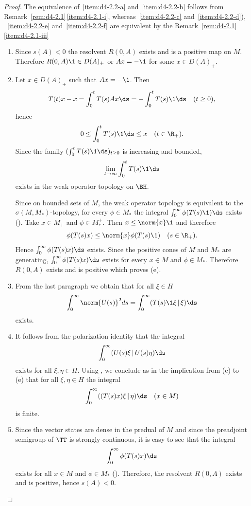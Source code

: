 \begin{proof}
The equivalence of~\ref{item:d4-2.2-a} and~\ref{item:d4-2.2-b} follows from Remark~\ref{rem:d4-2.1}\,\ref{item:d4-2.1-i}, whereas~\ref{item:d4-2.2-c} and~\ref{item:d4-2.2-d}), \resp ~\ref{item:d4-2.2-e} and~\ref{item:d4-2.2-f} are equivalent by the Remark~\ref{rem:d4-2.1}\,\ref{item:d4-2.1-iii}
\begin{enumerate}[wide, labelindent=.25em]

\item[(a) $\implies$ (c):] Since $s(A) < 0$ the resolvent $R(0,A)$ exists and is a positive map on $M$.
Therefore $R(0,A)\1 \in D(A)_{+}$ or $Ax = -\1$ for some $x \in D(A)_{+}$.


\item[(c) $\implies$ (e):] Let $x \in D(A)_{+}$ such that $Ax = -\1$.
Then
\[
T(t)x - x = \int_{0}^{t} T(s)Ax \ds = -\int_{0}^{t} T(s) \1 \ds \quad (t \geq 0),
\]
hence
\[
0 \leq \int_{0}^{t} T(s) \1 \ds \leq x \quad (t \in \R_{+}).
\]
Since the family $(\int_{0}^{t} T(s)\1 \ds)_{t \geq 0}$ is increasing and bounded, 
%
\[
	\lim_{t \to \infty} \int_{0}^{t} T(s) \1 \ds
\]
%
exists in the weak operator topology on $\BH$.

Since on bounded sets of\/ $M$, the weak operator topology is equivalent to the $\sigma(M,M_{*})$-topology, for every $\phi \in M_{*}$ the integral $ \int_{0}^{\infty}\phi(T(s) \1) \ds $ exists (\textcite[1.15.2.]{sakai:1971}).
Take $x \in M_{+}$ and $\phi \in M_{*}^{+}$.
Then $x \leq \norm{x} \1$ and therefore
\[
	\phi(T(s)x) \leq \norm{x}\phi(T(s) \1) \quad (s \in \R_{+}).
\]
Hence $\int_{0}^{\infty} \phi(T(s)x) \ds$ exists.
Since the positive cones of\/ $M$ and $M_{*}$ are generating, $\int_{0}^{\infty}\phi(T(s)x) \ds$ exists for every $x \in M$ and $\phi \in M_{*}$.
Therefore $R(0,A)$ exists and is positive which proves (e).

\item[(c) $\implies$ (g):] From the last paragraph we obtain that for all $\xi \in H$
\[
\int_{0}^{\infty}\norm{U(s)}^2ds = \int_{0}^{\infty}(T(s)\1\xi \,|\, \xi) \ds
\]
exists.

\item[(g) $\implies$ (h):] It follows from the polarization identity that the integral
\[
\int_{0}^{\infty}(U(s)\xi \,|\, U(s)\eta) \ds
\]
exists for all $\xi,\eta \in H$.
Using \textcite[Theorem III.4.2 and Theorem II.2.6]{takesaki:1979}, we conclude as in the implication from (c) to (e) that for all $\xi,\eta \in H$ the integral
\[
\int_{0}^{\infty}((T(s)x)\xi \,|\, \eta) \ds \quad (x \in M)
\]
is finite.

\item[(g) $\implies$ (a):] Since the vector states are dense in the predual of\/ $M$ and since the preadjoint semigroup of\/ $\TT$ is strongly continuous, it is easy to see that the integral
\[
\int_{0}^{\infty} \phi(T(s)x) \ds
\]
exists for all $x \in M$ and $\phi \in M_{*}$ (\textcite[Theorem II.2.6]{takesaki:1979}).
Therefore, the resolvent $R(0,A)$ exists and is positive, hence $s(A) < 0$.
\end{enumerate}
\end{proof}
